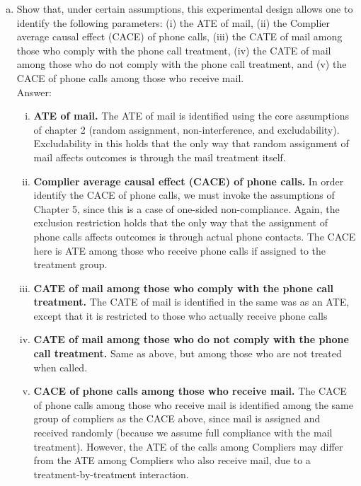 \documentclass[11pt,notitlepage]{article}\usepackage[]{graphicx}\usepackage[]{color}
\begin{document}
\begin{enumerate}[a)]
\item Show that, under certain assumptions, this experimental design allows one to identify the following parameters: (i) the ATE of mail, (ii) the Complier average causal effect (CACE) of phone calls, (iii) the CATE of mail among those who comply with the phone call treatment, (iv) the CATE of mail among those who do not comply with the phone call treatment, and (v) the CACE of phone calls among those who receive mail. \\
Answer:\\
\begin{enumerate}[(i)]

\item \textbf{ATE of mail.} The ATE of mail is identified using the core assumptions of chapter 2 (random assignment, non-interference, and excludability). Excludability in this holds that the only way that random assignment of mail affects outcomes is through the mail treatment itself. 

\item \textbf{Complier average causal effect (CACE) of phone calls.} In order identify the CACE of phone calls, we must invoke the assumptions of Chapter 5, since this is a case of one-sided non-compliance. Again, the exclusion restriction holds that the only way that the assignment of phone calls affects outcomes is through actual phone contacts. The CACE here is ATE among those who receive phone calls if assigned to the treatment group.

\item \textbf{CATE of mail among those who comply with the phone call treatment.}  The CATE of mail is identified in the same was as an ATE, except that it is restricted to those who actually receive phone calls

\item \textbf{CATE of mail among those who do not comply with the phone call treatment.} Same as above, but among those who are not treated when called.

\item \textbf{CACE of phone calls among those who receive mail.} The CACE of phone calls among those who receive mail is identified among the same group of compliers as the CACE above, since mail is assigned and received randomly (because we assume full compliance with the mail treatment). However, the ATE of the calls among Compliers may differ from the ATE among Compliers who also receive mail, due to a treatment-by-treatment interaction. 


\end{enumerate}
\end{enumerate}
\end{document}
